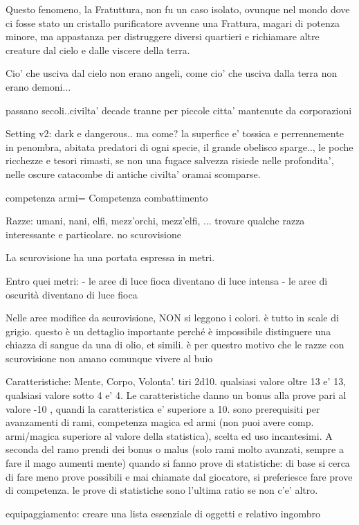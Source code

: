 \documentclass[12pt,a4paper,twoside,openany]{book}
\begin{document}
Questo fenomeno, la Fratuttura, non fu un caso isolato, ovunque nel mondo dove ci fosse stato un cristallo purificatore avvenne una Frattura, magari di potenza minore, ma appastanza per distruggere diversi quartieri e richiamare altre creature dal cielo e dalle viscere della terra.

Cio' che usciva dal cielo non erano angeli, come cio' che usciva dalla terra non erano demoni...

passano secoli..civilta' decade tranne per piccole citta' mantenute da corporazioni


Setting v2: dark e dangerous.. ma come?
la superfice e'  tossica e perrennemente in penombra, abitata predatori di ogni specie, il grande obelisco sparge.., le poche ricchezze e tesori rimasti, se non una fugace salvezza risiede nelle profondita', nelle oscure catacombe di antiche civilta' oramai scomparse.

competenza armi= Competenza combattimento


Razze: umani, nani, elfi, mezz'orchi, mezz'elfi, ... trovare qualche razza interessante e particolare. no scurovisione  

La scurovisione ha una portata espressa in metri. 

Entro quei metri: 
- le aree di luce fioca diventano di luce intensa
- le aree di oscurità diventano di luce fioca

Nelle aree modifice da scurovisione, NON si leggono i colori.  è tutto in scale di grigio. questo è un dettaglio importante perché è impossibile distinguere una chiazza di sangue da una di olio, et simili. è per questro motivo che le razze con scurovisione non amano comunque vivere al buio

Caratteristiche: Mente, Corpo, Volonta'. tiri 2d10. qualsiasi valore oltre 13 e' 13, qualsiasi valore sotto 4 e' 4.
Le caratteristiche danno un bonus alla prove pari al valore -10 , quandi la caratteristica e' superiore a 10. sono prerequisiti per avanzamenti di rami, competenza magica ed armi (non puoi avere comp. armi/magica superiore al valore della statistica), scelta ed uso incantesimi. A seconda del ramo prendi dei bonus o malus (solo rami molto avanzati, sempre a fare il mago aumenti mente)
quando si fanno prove di statistiche: di base si cerca di fare meno prove possibili e mai chiamate dal giocatore, si preferiesce fare prove di competenza. le prove di statistiche sono l'ultima ratio se non c'e' altro.


equipaggiamento: creare una lista essenziale di oggetti e relativo ingombro
\end{document}

